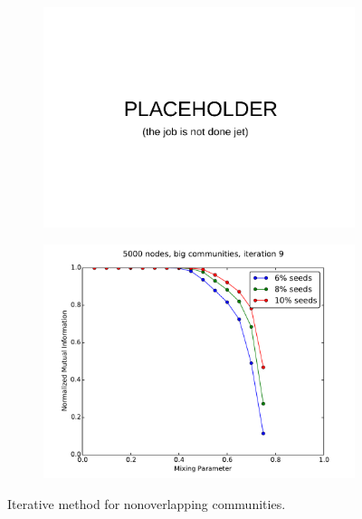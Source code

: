 \begin{figure}
\begin{subfigure}{0.5\textwidth}
    \includegraphics[width=\linewidth]{allplots/placeholder.pdf}
    \end{subfigure}%
    \begin{subfigure}{0.5\textwidth}
    \includegraphics[width=\linewidth]{allplots/nonoverlap_iter_d.pdf}
    \end{subfigure}
    \caption{Iterative method for nonoverlapping communities.}
\end{figure}

